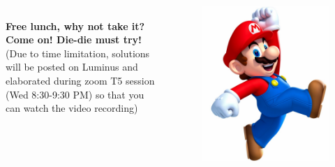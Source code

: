 \begin{frame}[fragile]{}
	\begin{columns}[t]
	\\\vspace{5pt}
	\textbf{Free lunch, why not take it?}\\
	\textbf{Come on! Die-die must try!}\\\vspace{10pt}
	(Due to time limitation, solutions will be posted on Luminus and elaborated during zoom T5 session (Wed 8:30-9:30 PM) so that you can watch the video recording)
	\begin{figure}
		\includegraphics[width=1\textwidth, trim=0 0 0 0, clip]{t5/images/mario.png}
	\end{figure}
\end{columns}
\end{frame}


